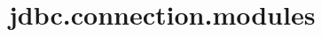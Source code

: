 \section{jdbc.connection.modules}
\label{configuration:JdbcConnectionModules}
\AvailableInJavaOnly{\TODO}